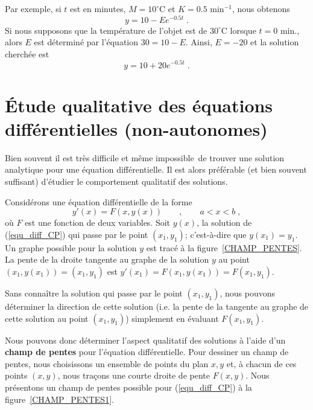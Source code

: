 {\begin{egg}
Par exemple, si $t$ est en minutes, $M=10^\circ$C et $K = 0.5$
min$^{-1}$, nous obtenons
\[
y = 10 - E e^{-0.5t} \; .
\]
Si nous supposons que la température de l'objet est de $30^\circ$C lorsque
$t=0$ min., alors $E$ est déterminé par l'équation $30 = 10 - E$.
Ainsi, $E=-20$ et la solution cherchée est
\[
y = 10 + 20 e^{-0.5t} \; .
\]
\label{egg_newton_law}
\end{egg}

\section[Équations non-autonomes \life]{Étude qualitative des
  équations différentielles (non-autonomes) \life}

Bien souvent il est très difficile et même \lgm impossible\rgm\ de
trouver une solution analytique pour une équation différentielle.  Il
est alors préférable (et bien souvent suffisant) d'étudier le
comportement qualitatif des solutions.

Considérons une équation différentielle de la forme
\begin{equation}\label{equ_diff_CP}
y'(x) = F(x,y(x)) \qquad , \qquad a<x<b \; ,
\end{equation}
où $F$ est une fonction de deux variables.  Soit $y(x)$, la solution
de (\ref{equ_diff_CP}) qui passe par le point $(x_1,y_1)$;
c'est-à-dire que $y(x_1) = y_1$.  Un graphe possible pour la solution
$y$ est tracé à la figure~\ref{CHAMP_PENTES}.  La pente de la droite
tangente au graphe de la solution $y$ au point
$(x_1, y(x_1)) = (x_1,y_1)$ est
$y'(x_1) = F(x_1,y(x_1)) = F(x_1,y_1)$. 

Sans connaître la solution qui passe par le point $(x_1,y_1)$, nous pouvons
déterminer la direction de cette solution (i.e. la pente de la
tangente au graphe de cette solution au point $(x_1,y_1)$) simplement
en évaluant $F(x_1,y_1)$.


Nous pouvons donc déterminer l'aspect qualitatif des solutions à l'aide
d'un {\bfseries champ de pentes} pour
l'équation différentielle.  Pour dessiner un champ de pentes, nous
choisissons un ensemble de points du plan $x,y$ et, à chacun de ces points
$(x,y)$, nous traçons une courte droite de pente $F(x,y)$.  Nous
présentons un champ de pentes possible pour (\ref{equ_diff_CP}) à la
figure~\ref{CHAMP_PENTES1}.

}
